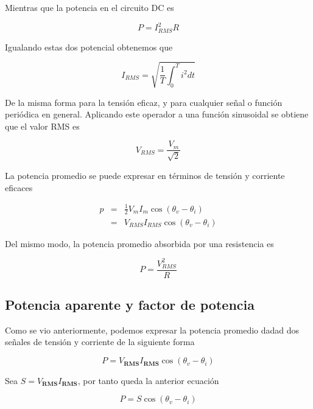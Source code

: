 Mientras que la potencia en el circuito DC es

\begin{equation*}
P = I_{RMS}^2 R
\end{equation*}

Igualando estas dos potencial obtenemos que 

\begin{equation*}
I_{RMS} = \sqrt{\frac{1}{T}\int_0^T i^2 dt}
\end{equation*}

De la misma forma para la tensión eficaz, y para cualquier señal o función periódica en general. Aplicando este operador a una función sinusoidal se obtiene que el valor RMS es

\begin{equation*}
V_{RMS} = \frac{V_m}{\sqrt{2}} 
\end{equation*}

La potencia promedio se puede expresar en términos de tensión y corriente eficaces

\begin{eqnarray*}
p &=& \frac{1}{2}V_m I_m \cos (\theta_v - \theta_i) \\
&=& V_{RMS} I_{RMS} \cos (\theta_v - \theta_i) 
\end{eqnarray*}

Del mismo modo, la potencia promedio absorbida por una resistencia es

\begin{equation*}
P = \frac{V_{RMS}^2}{R}
\end{equation*}

\subsection{Potencia aparente y factor de potencia}

Como se vio anteriormente, podemos expresar la potencia promedio dadad dos señales de tensión y corriente de la siguiente forma

\begin{equation*}
P = V_{\textbf{RMS}} I_{\textbf{RMS}} \cos  (\theta_v - \theta_i) 
\end{equation*}

Sea $S=V_{\textbf{RMS}} I_{\textbf{RMS}}$, por tanto queda la anterior ecuación

\begin{equation*}
P = S  \cos  (\theta_v - \theta_i)
\end{equation*}

